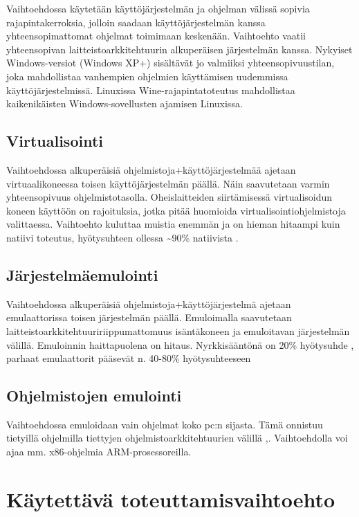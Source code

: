 \documentclass[11pt,a4paper,oneside,article]{memoir}
\begin{document}
Vaihtoehdossa käytetään käyttöjärjestelmän ja ohjelman välissä sopivia
rajapintakerroksia, jolloin saadaan käyttöjärjestelmän kanssa
yhteensopimattomat ohjelmat toimimaan keskenään. Vaihtoehto vaatii
yhteensopivan laitteistoarkkitehtuurin alkuperäisen järjestelmän kanssa.
Nykyiset Windows-versiot (Windows XP+) sisältävät jo valmiiksi
yhteensopivuustilan, joka mahdollistaa vanhempien ohjelmien käyttämisen
uudemmissa käyttöjärjestelmissä. Linuxissa Wine-rajapintatoteutus
mahdollistaa kaikenikäisten Windows-sovellusten ajamisen Linuxissa.

\subsection{Virtualisointi}

Vaihtoehdossa alkuperäisiä ohjelmistoja+käyttöjärjestelmää ajetaan
virtuaalikoneessa toisen käyttöjärjestelmän päällä. Näin saavutetaan
varmin yhteensopivuus ohjelmistotasolla. Oheislaitteiden siirtämisessä
virtualisoidun koneen käyttöön on rajoituksia, jotka pitää huomioida
virtualisointiohjelmistoja valittaessa. Vaihtoehto kuluttaa muistia
enemmän ja on hieman hitaampi kuin natiivi toteutus, hyötysuhteen
ollessa \textasciitilde{}90\% natiivista \cite{virtnat_anadtech}.

\subsection{Järjestelmäemulointi}

Vaihtoehdossa alkuperäisiä ohjelmistoja+käyttöjärjestelmä ajetaan
emulaattorissa toisen järjestelmän päällä. Emuloimalla saavutetaan
laitteistoarkkitehtuuririippumattomuus isäntäkoneen ja emuloitavan
järjestelmän välillä. Emuloinnin haittapuolena on hitaus. Nyrkkisääntönä
on 20\% hyötysuhde \cite{tinycc}, parhaat emulaattorit
pääsevät n. 40-80\% hyötysuhteeseen \cite{40pperf} \cite{eltechs:exagear}

\subsection{Ohjelmistojen emulointi}

Vaihtoehdossa emuloidaan vain ohjelmat koko pc:n sijasta. Tämä onnistuu
tietyillä ohjelmilla tiettyjen ohjelmistoarkkitehtuurien välillä
\cite{tinycc},\cite{qemu_use}. Vaihtoehdolla voi ajaa mm.
x86-ohjelmia ARM-prosessoreilla.

\section{Käytettävä toteuttamisvaihtoehto}
\end{document}
